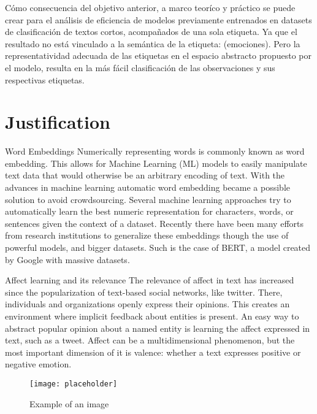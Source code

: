 Cómo consecuencia del objetivo anterior, a marco teoríco y práctico se puede crear para el análisis de eficiencia de modelos previamente entrenados en datasets de clasificación de textos cortos, acompañados de una sola etiqueta. Ya que el resultado no está vinculado a la semántica de la etiqueta: (emociones). Pero la representatividad adecuada de las etiquetas en el espacio abstracto propuesto por el modelo, resulta en la más fácil clasificación de las observaciones y sus respectivas etiquetas.

\section{Justification}\label{sec:Justification}

Word Embeddings
Numerically representing words is commonly known as word embedding. This allows for Machine Learning (ML) models to easily manipulate text data that would otherwise be an arbitrary encoding of text. With the advances in machine learning automatic word embedding became a possible solution to avoid crowdsourcing. %
Several machine learning approaches try to automatically learn the best numeric representation for characters, words, or sentences given the context of a dataset. Recently there have been many efforts from research institutions to generalize these embeddings though the use of powerful models, and bigger datasets. Such is the case of BERT, a model created by Google with massive datasets.

Affect learning and its relevance
The relevance of affect in text has increased since the popularization of text-based social networks, like twitter. There, individuals and organizations openly express their opinions. This creates an environment where implicit feedback about entities is present. An easy way to abstract popular opinion about a named entity is learning the affect expressed in text, such as a tweet. Affect can be a multidimensional phenomenon, but the most important dimension of it is valence: whether a text expresses positive or negative emotion.




\begin{figure}[H]
  \texttt{[image: placeholder]}
  \centering
  \caption{Example of an image}
\end{figure}\label{fig:placeholder}



